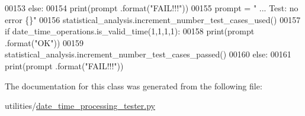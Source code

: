 \begin{DoxyCode}
00153         \textcolor{keywordflow}{else}:
00154             print(prompt .format(\textcolor{stringliteral}{"FAIL!!!"}))
00155         prompt = \textcolor{stringliteral}{"  ... Test: no error                  \{\}"}
00156         statistical\_analysis.increment\_number\_test\_cases\_used()
00157         \textcolor{keywordflow}{if} date\_time\_operations.is\_valid\_time(1,1,1,1):
00158             print(prompt .format(\textcolor{stringliteral}{"OK"}))
00159             statistical\_analysis.increment\_number\_test\_cases\_passed()
00160         \textcolor{keywordflow}{else}:
00161             print(prompt .format(\textcolor{stringliteral}{"FAIL!!!"}))
\end{DoxyCode}


The documentation for this class was generated from the following file\+:\begin{DoxyCompactItemize}
\item 
utilities/\hyperlink{date__time__processing__tester_8py}{date\+\_\+time\+\_\+processing\+\_\+tester.\+py}\end{DoxyCompactItemize}
